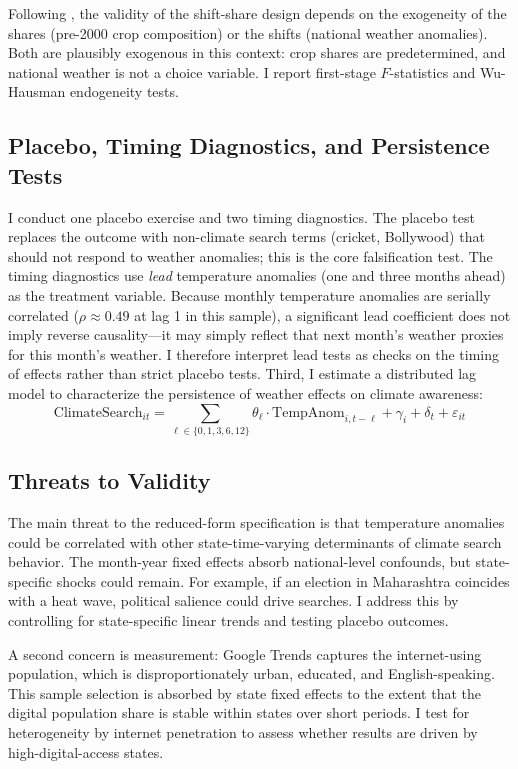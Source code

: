 \documentclass[12pt]{article}
\begin{document}
Following \citet{goldsmithpinkham2020}, the validity of the shift-share design depends on the exogeneity of the shares (pre-2000 crop composition) or the shifts (national weather anomalies). Both are plausibly exogenous in this context: crop shares are predetermined, and national weather is not a choice variable. I report first-stage $F$-statistics and Wu-Hausman endogeneity tests.

\subsection{Placebo, Timing Diagnostics, and Persistence Tests}

I conduct one placebo exercise and two timing diagnostics. The placebo test replaces the outcome with non-climate search terms (cricket, Bollywood) that should not respond to weather anomalies; this is the core falsification test. The timing diagnostics use \textit{lead} temperature anomalies (one and three months ahead) as the treatment variable. Because monthly temperature anomalies are serially correlated ($\rho \approx 0.49$ at lag 1 in this sample), a significant lead coefficient does not imply reverse causality---it may simply reflect that next month's weather proxies for this month's weather. I therefore interpret lead tests as checks on the timing of effects rather than strict placebo tests. Third, I estimate a distributed lag model to characterize the persistence of weather effects on climate awareness:
\begin{equation}
\text{ClimateSearch}_{it} = \sum_{\ell \in \{0,1,3,6,12\}} \theta_\ell \cdot \text{TempAnom}_{i,t-\ell} + \gamma_i + \delta_t + \varepsilon_{it}
\end{equation}

\subsection{Threats to Validity}

The main threat to the reduced-form specification is that temperature anomalies could be correlated with other state-time-varying determinants of climate search behavior. The month-year fixed effects absorb national-level confounds, but state-specific shocks could remain. For example, if an election in Maharashtra coincides with a heat wave, political salience could drive searches. I address this by controlling for state-specific linear trends and testing placebo outcomes.

A second concern is measurement: Google Trends captures the internet-using population, which is disproportionately urban, educated, and English-speaking. This sample selection is absorbed by state fixed effects to the extent that the digital population share is stable within states over short periods. I test for heterogeneity by internet penetration to assess whether results are driven by high-digital-access states.
\end{document}
